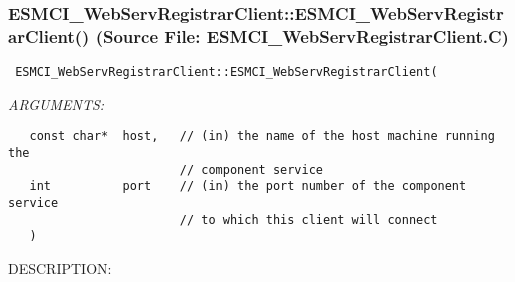  
\setlength{\oldparskip}{\parskip}
\setlength{\parskip}{1.5ex}
\setlength{\oldparindent}{\parindent}
\setlength{\parindent}{0pt}
\setlength{\oldbaselineskip}{\baselineskip}
\setlength{\baselineskip}{11pt}
 
\def\bv{\begin{verbatim}}
\def\ev{\end{verbatim}}
\def\be{\begin{equation}}
\def\ee{\end{equation}}
\def\bea{\begin{eqnarray}}
\def\eea{\end{eqnarray}}
\def\bi{\begin{itemize}}
\def\ei{\end{itemize}}
\def\bn{\begin{enumerate}}
\def\en{\end{enumerate}}
\def\bd{\begin{description}}
\def\ed{\end{description}}
\def\({\left (}
\def\){\right )}
\def\[{\left [}
\def\]{\right ]}
\def\<{\left  \langle}
\def\>{\right \rangle}
\def\cI{{\cal I}}
\def\diag{\mathop{\rm diag}}
\def\tr{\mathop{\rm tr}}


 
\subsubsection{ESMCI\_WebServRegistrarClient::ESMCI\_WebServRegistrarClient() (Source File: ESMCI\_WebServRegistrarClient.C)}


  
\begin{verbatim} ESMCI_WebServRegistrarClient::ESMCI_WebServRegistrarClient(\end{verbatim}{\em ARGUMENTS:}
\begin{verbatim}   const char*  host,   // (in) the name of the host machine running the
                        // component service
   int          port    // (in) the port number of the component service
                        // to which this client will connect
   )\end{verbatim}
{\sf DESCRIPTION:\\ }


